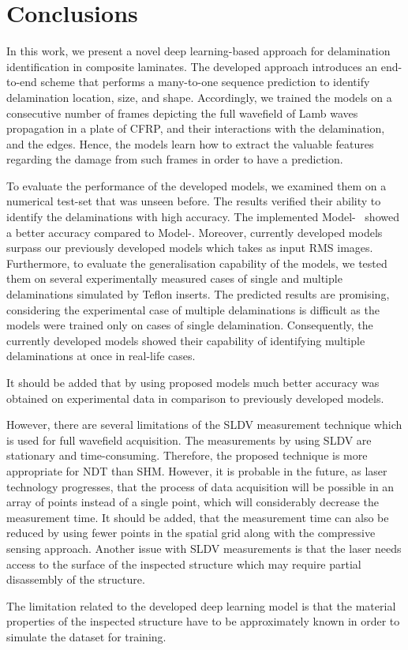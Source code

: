 \section{Conclusions}
\label{conclusion}
In this work, we present a novel deep learning-based approach for delamination identification in composite laminates.
The developed approach introduces an end-to-end scheme that performs a many-to-one sequence prediction to identify delamination location, size, and shape.
Accordingly, we trained the models on a consecutive number of frames depicting the full wavefield of Lamb waves propagation in a plate of CFRP, and their interactions with the delamination, and the edges.
Hence, the models learn how to extract the valuable features regarding the damage from such frames in order to have a prediction.

To evaluate the performance of the developed models, we examined them on a numerical test-set that was unseen before.
The results verified their ability to identify the delaminations with high accuracy. 
The implemented Model-~ showed a better accuracy compared to Model-.
Moreover, currently developed models surpass our previously developed models which takes as input RMS images.
Furthermore, to evaluate the generalisation capability of the models, we tested them on several experimentally measured cases of single and multiple delaminations simulated by Teflon inserts.
The predicted results are promising, considering the experimental case of multiple delaminations is difficult as the models were trained only on cases of single delamination.
Consequently, the currently developed models showed their capability of identifying multiple delaminations at once in real-life cases.

It should be added that by using proposed models much better accuracy was obtained on experimental data in comparison to previously developed models.

However, there are several limitations of the SLDV measurement technique which is used for full wavefield acquisition.
The measurements by using SLDV are stationary and time-consuming.
Therefore, the proposed technique is more appropriate for NDT than SHM.
However, it is probable in the future, as
laser technology progresses, that the process of data acquisition will be possible in an array of points instead of a single point, which will considerably decrease the measurement time.
It should be added, that the measurement time can also be reduced by using fewer points in the spatial grid along with the compressive sensing approach.
Another issue with SLDV measurements is that the laser needs access to the surface of the inspected structure which may require partial disassembly of the structure.

The limitation related to the developed deep learning model is that the material properties of the inspected structure have to be approximately known in order to simulate the dataset for training.


